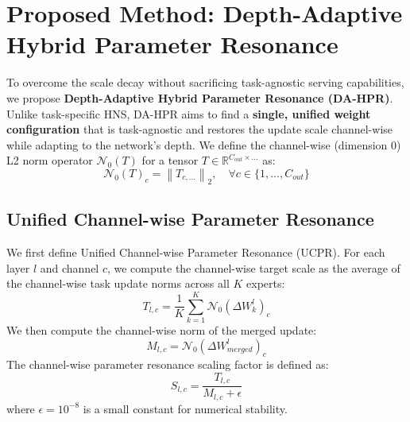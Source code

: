 \documentclass{article}
\theoremstyle{plain}
\theoremstyle{definition}
\theoremstyle{remark}
\begin{document}
\section{Proposed Method: Depth-Adaptive Hybrid Parameter Resonance}
\label{submission3:sec:method}

To overcome the scale decay without sacrificing task-agnostic serving capabilities, we propose \textbf{Depth-Adaptive Hybrid Parameter Resonance (DA-HPR)}.
Unlike task-specific HNS, DA-HPR aims to find a \textbf{single, unified weight configuration} that is task-agnostic and restores the update scale channel-wise while adapting to the network's depth.
We define the channel-wise (dimension 0) L2 norm operator $\mathcal{N}_0(T)$ for a tensor $T \in \mathbb{R}^{C_{out} \times \dots}$ as:
\begin{equation}
    \mathcal{N}_0(T)_c = \left\| T_{c, \dots} \right\|_2, \quad \forall c \in \{1, \dots, C_{out}\}
\end{equation}

\subsection{Unified Channel-wise Parameter Resonance}
We first define Unified Channel-wise Parameter Resonance (UCPR).
For each layer $l$ and channel $c$, we compute the channel-wise target scale as the average of the channel-wise task update norms across all $K$ experts:
\begin{equation}
    T_{l,c} = \frac{1}{K} \sum_{k=1}^K \mathcal{N}_0(\Delta W_k^l)_c
\end{equation}
We then compute the channel-wise norm of the merged update:
\begin{equation}
    M_{l,c} = \mathcal{N}_0(\Delta W_{merged}^l)_c
\end{equation}
The channel-wise parameter resonance scaling factor is defined as:
\begin{equation}
    S_{l,c} = \frac{T_{l,c}}{M_{l,c} + \epsilon}
\end{equation}
where $\epsilon = 10^{-8}$ is a small constant for numerical stability.
\end{document}
